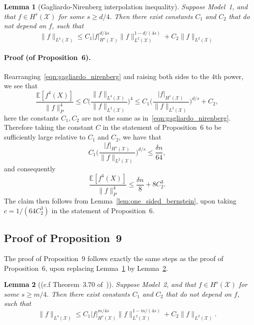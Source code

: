 \documentclass[aos]{imsart}
\theoremstyle{plain}
\newtheorem{lemma}{Lemma}
\theoremstyle{definition}
\theoremstyle{remark}
\newcommand{\Ebb}{\mathbb{E}}
\newcommand{\mc}[1]{\mathcal{#1}}
\newcommand{\1}{\mathbf{1}}
\begin{document}
\begin{lemma}[Gagliardo-Nirenberg interpolation inequality]
	\label{lem:gagliardo_nirenberg}
	Suppose Model~1, and that $f \in H^s(\mc{X})$ for some $s \geq d/4$. Then there exist constants $C_1$ and $C_2$ that do not depend on $f$, such that
	\begin{equation}
	\label{eqn:gagliardo_nirenberg}
	\|f\|_{L^4(\mc{X})} \leq C_1 |f|_{H^s(\mc{X})}^{d/4s} \|f\|_{L^2(\mc{X})}^{1 - d/(4s)} + C_2 \|f\|_{L^2(\mc{X})}
	\end{equation}
\end{lemma}


\paragraph{Proof (of Proposition~6).}
Rearranging~\eqref{eqn:gagliardo_nirenberg} and raising both sides to the $4$th power, we see that
\begin{equation*}
\frac{\Ebb[f^4(X)]}{\|f\|_P^4} \leq C \biggl(\frac{\|f\|_{L^4(\mc{X})}}{\|f\|_{L^2(\mc{X})}}\biggr)^4 \leq C_1\biggl(\frac{|f|_{H^s(\mc{X})}}{\|f\|_{L^2(\mc{X})}}\biggr)^{d/s} + C_2,
\end{equation*}
here the constants $C_1,C_2$ are not the same as in~\eqref{eqn:gagliardo_nirenberg}. Therefore taking the constant $C$ in the statement of Proposition~6 to be sufficiently large relative to $C_1$ and $C_2$, we have that
\begin{equation*}
C_1\biggl(\frac{|f|_{H^s(\mc{X})}}{\|f\|_{L^2(\mc{X})}}\biggr)^{d/s} \leq \frac{\delta n}{64},
\end{equation*} 
and consequently 
\begin{equation*}
\frac{\Ebb[f^4(X)]}{\|f\|_P^4} \leq \frac{\delta n}{8} + 8C_2^3.
\end{equation*}
The claim then follows from Lemma~\ref{lem:one_sided_bernstein}, upon taking $c = 1/(64C_2^3)$ in the statement of Proposition~6.

\subsection{Proof of Proposition~9}
\label{subsec:empirical_norm_sobolev_manifold}
The proof of Proposition~9 follows exactly the same steps as the proof of Proposition~6, upon replacing Lemma~\ref{lem:gagliardo_nirenberg} by Lemma~\ref{lem:gagliardo_nirenberg_manifold}.
\begin{lemma}[(c.f Theorem~3.70 of~\citet{aubin2012})]
	\label{lem:gagliardo_nirenberg_manifold}
	Suppose Model~2, and that $f \in H^s(\mc{X})$ for some $s \geq m/4$. Then there exist constants $C_1$ and $C_2$ that do not depend on $f$, such that
	\begin{equation}
	\label{eqn:gagliardo_nirenberg_manifold}
	\|f\|_{L^4(\mc{X})} \leq C_1 |f|_{H^s(\mc{X})}^{m/4s} \|f\|_{L^2(\mc{X})}^{1 - m/(4s)} + C_2 \|f\|_{L^2(\mc{X})}.
	\end{equation}
\end{lemma}
\end{document}

